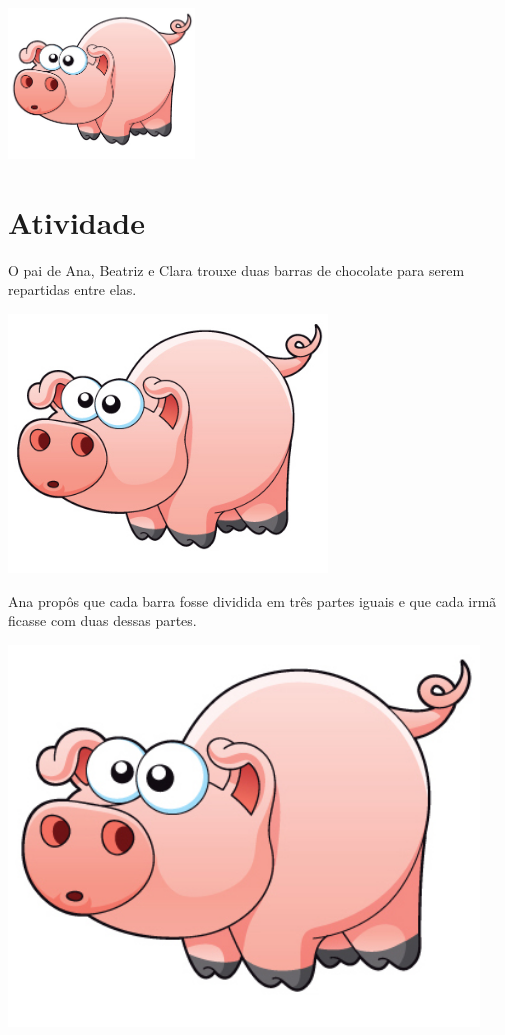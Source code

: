 \documentclass[a4,12pt]{book}
\begin{document}
\includegraphics[width=\textwidth,height=4cm, keepaspectratio]{pig}
\section{Atividade}







O pai de Ana, Beatriz e Clara trouxe duas barras de chocolate para serem repartidas entre elas.

\includegraphics[width=240pt, keepaspectratio]{pig}

Ana propôs que cada barra fosse dividida em três partes iguais e que cada irmã ficasse com duas dessas partes.

\includegraphics[width=354pt, keepaspectratio]{pig}
\end{document}
